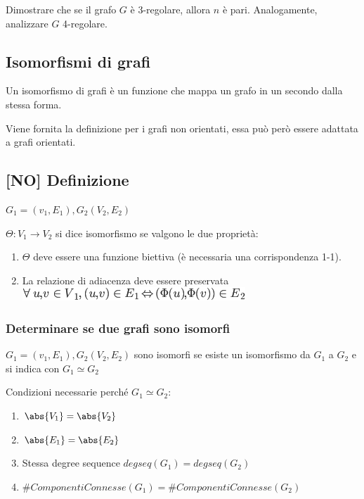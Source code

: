 \documentclass{article}
\providecommand{\tightlist}{%
  \setlength{\itemsep}{0pt}\setlength{\parskip}{0pt}}
\begin{document}
{{{{Dimostrare che se il grafo $G$ è 3-regolare, allora $n$ è pari. Analogamente, analizzare $G$ 4-regolare. }

\hypertarget{h.d5v408sc7po0}{\subsection{\texorpdfstring{{Isomorfismi di
grafi}}{Isomorfismi di grafi}}\label{h.d5v408sc7po0}}

{Un isomorfismo di grafi è un funzione che mappa un grafo in un secondo dalla stessa forma.}

{Viene fornita la definizione per i grafi non orientati, essa può però essere adattata a grafi orientati.}

\subsection{{[}NO{]} Definizione}

$G_1=(v_1,E_1),G_2(V_2,E_2)$

{$\Theta:V_1\rightarrow V_2$ si dice isomorfismo se valgono le due proprietà:}

\begin{enumerate}
\tightlist
\item
  {$\Theta$ deve essere una funzione biettiva (è necessaria una corrispondenza 1-1).}
\item
  {La relazione di adiacenza deve essere preservata\\
  }\includegraphics{images/image429.png}
\end{enumerate}

{}

\hypertarget{h.umjijdswjd6a}{\subsubsection{\texorpdfstring{{Determinare
se due grafi sono isomorfi}}{Determinare se due grafi sono isomorfi}}\label{h.umjijdswjd6a}}

{}

{$G_1=(v_1,E_1),G_2(V_2,E_2)$ sono isomorfi se esiste un isomorfismo da $G_1$ a $G_2$ e si indica con $G_1\simeq G_2$}


{Condizioni necessarie perché $G_1\simeq G_2$:}

\begin{enumerate}
\tightlist
\item
  $\abs{V_1}=\abs{V_2}$
\item
  $\abs{E_1}=\abs{E_2}$
\item
  {Stessa degree sequence $degseq(G_1) = degseq(G_2)$}
\item
  $\#ComponentiConnesse(G_1) = 	\#ComponentiConnesse(G_2)$
\end{enumerate}

}}}
\end{document}
